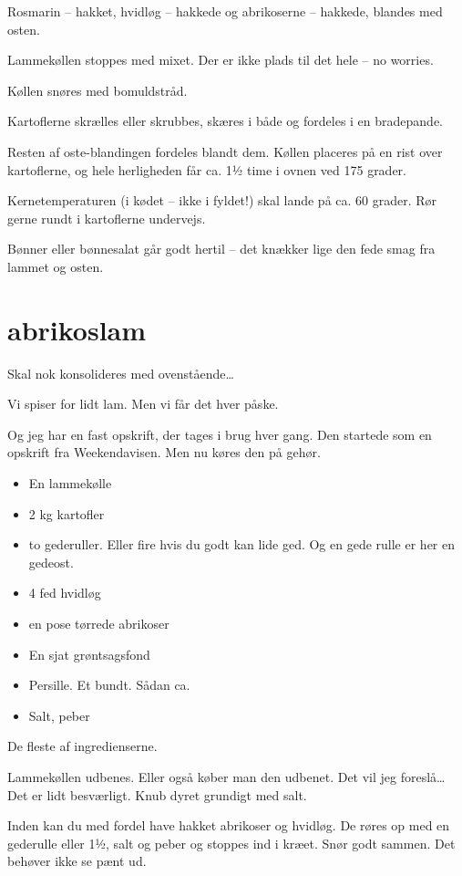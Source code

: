 \documentclass[
]{book}
\providecommand{\tightlist}{%
  \setlength{\itemsep}{0pt}\setlength{\parskip}{0pt}}
\begin{document}
Rosmarin -- hakket, hvidløg -- hakkede og abrikoserne -- hakkede, blandes med osten.

Lammekøllen stoppes med mixet. Der er ikke plads til det hele -- no worries.

Køllen snøres med bomuldstråd.

Kartoflerne skrælles eller skrubbes, skæres i både og fordeles i en bradepande.

Resten af oste-blandingen fordeles blandt dem. Køllen placeres på en rist over kartoflerne, og hele herligheden får ca. 1½ time i ovnen ved 175 grader.

Kernetemperaturen (i kødet -- ikke i fyldet!) skal lande på ca. 60 grader. Rør gerne rundt i kartoflerne undervejs.

Bønner eller bønnesalat går godt hertil -- det knækker lige den fede smag fra lammet og osten.

\hypertarget{abrikoslam}{%
\section{abrikoslam}\label{abrikoslam}}

Skal nok konsolideres med ovenstående\ldots{}

Vi spiser for lidt lam. Men vi får det hver påske.

Og jeg har en fast opskrift, der tages i brug hver gang. Den startede som en opskrift fra Weekendavisen. Men nu køres den på gehør.

\begin{itemize}
\tightlist
\item
  En lammekølle
\item
  2 kg kartofler
\item
  to gederuller. Eller fire hvis du godt kan lide ged. Og en gede rulle er her en gedeost.
\item
  4 fed hvidløg
\item
  en pose tørrede abrikoser
\item
  En sjat grøntsagsfond
\item
  Persille. Et bundt. Sådan ca.
\item
  Salt, peber
\end{itemize}

De fleste af ingredienserne.

Lammekøllen udbenes. Eller også køber man den udbenet. Det vil jeg foreslå\ldots{} Det er lidt besværligt. Knub dyret grundigt med salt.

Inden kan du med fordel have hakket abrikoser og hvidløg. De røres op med en gederulle eller 1½, salt og peber og stoppes ind i kræet. Snør godt sammen. Det behøver ikke se pænt ud.
\end{document}
